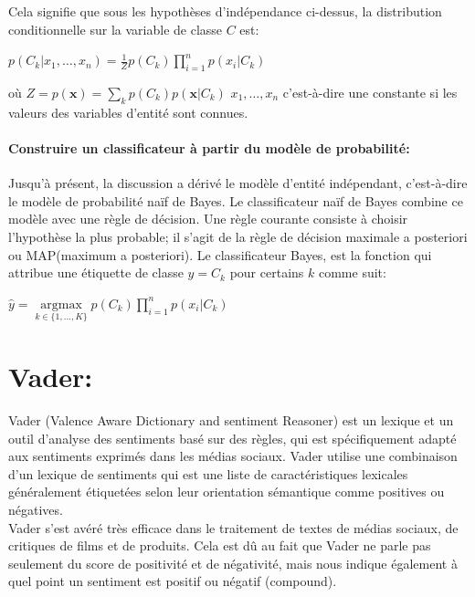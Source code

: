 Cela signifie que sous les hypothèses d'indépendance ci-dessus, la distribution conditionnelle sur la variable de classe $C$ est: \\
\begin{center}
    $p\left(C_{k} | x_{1}, \ldots, x_{n}\right)=\frac{1}{Z} p\left(C_{k}\right) \prod_{i=1}^{n} p\left(x_{i} | C_{k}\right)$
\end{center}
où $Z=p(\mathbf{x})=\sum_{k} p\left(C_{k}\right) p\left(\mathbf{x} | C_{k}\right)$ $x_{1}, \ldots, x_{n}$ c'est-à-dire une constante si les valeurs des variables d'entité sont connues.
\paragraph{Construire un classificateur à partir du modèle de probabilité:}
Jusqu'à présent, la discussion a dérivé le modèle d'entité indépendant, c'est-à-dire le modèle de probabilité naïf de Bayes. Le classificateur naïf de Bayes combine ce modèle avec une règle de décision. Une règle courante consiste à choisir l'hypothèse la plus probable; il s'agit de la règle de décision maximale a posteriori ou MAP(maximum a posteriori). Le classificateur Bayes, est la fonction qui attribue une étiquette de classe ${\displaystyle {\hat{y}} = C_ {k}}$ pour certains $k$ comme suit: \\
\begin{center}
    $\hat{y}=\underset{k \in\{1, \ldots, K\}}{\operatorname{argmax}} p\left(C_{k}\right) \prod_{i=1}^{n} p\left(x_{i} | C_{k}\right)$  
\end{center}


\section{Vader:}
Vader (Valence Aware Dictionary and sentiment Reasoner) est un lexique et un outil d'analyse des sentiments basé sur des règles, qui est spécifiquement adapté aux sentiments exprimés dans les médias sociaux. Vader utilise une combinaison d'un lexique de sentiments qui est une liste de caractéristiques lexicales généralement étiquetées selon leur orientation sémantique comme positives ou négatives.\\

Vader s'est avéré très efficace dans le traitement de textes de médias sociaux, de critiques de films et de produits. Cela est dû au fait que Vader ne parle pas seulement du score de positivité et de négativité, mais nous indique également à quel point un sentiment est positif ou négatif (compound).\cite{hutto2014Vader}\\


